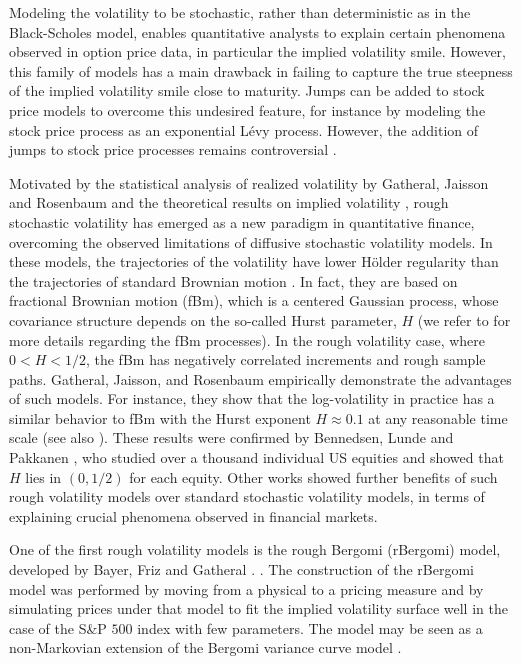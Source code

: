 Modeling the volatility to be stochastic, rather than deterministic as in the Black-Scholes model, enables quantitative analysts to  explain certain phenomena observed in option price data, in particular the implied volatility smile. However, this family of models has a  main drawback in failing  to capture the true steepness of the implied volatility smile close to maturity. Jumps can be added to stock price models to overcome this undesired feature, for instance by modeling the stock price process as an exponential L\'evy process. However, the addition of jumps to stock price processes remains controversial \cite{christensen2014fact,bajgrowicz2015jumps}. 

Motivated by the statistical analysis of realized volatility by Gatheral, Jaisson and Rosenbaum \cite{gatheral2018volatility} and the theoretical results on implied volatility    \cite{alos2007short,fukasawa2011asymptotic}, rough stochastic volatility has emerged as a new paradigm in quantitative finance, overcoming the observed limitations of  diffusive stochastic volatility models. In these models, the trajectories of the volatility  have lower H\"older regularity than the trajectories of standard Brownian motion \cite{bayer2016pricing,gatheral2018volatility}. In fact, they are based on fractional Brownian motion (fBm), which  is a centered Gaussian process, whose covariance structure depends on  the so-called Hurst parameter, $H$ (we refer to  \cite{mandelbrot1968fractional,coutin07introduction,biagini2008stochastic} for more details regarding the fBm processes). In the rough volatility case, where $0<H<1/2$, the fBm has negatively correlated increments and rough sample paths.   Gatheral, Jaisson, and Rosenbaum \cite{gatheral2018volatility}  empirically demonstrate the advantages of such models. For instance, they show that the log-volatility in practice has a similar behavior to  fBm with the Hurst exponent $H \approx 0.1$ at any reasonable time scale (see also  \cite{gatheral2014volatility_2}).  These results were confirmed  by Bennedsen, Lunde and Pakkanen \cite{bennedsen2016decoupling}, who studied over a thousand individual US equities and showed that $H$ lies in $(0,1/2)$ for each equity. Other  works \cite{bennedsen2016decoupling,bayer2016pricing,gatheral2018volatility} showed further benefits of  such rough volatility models over  standard stochastic volatility models,   in terms of explaining crucial phenomena  observed in  financial markets.

One of the first rough volatility models is the rough Bergomi (rBergomi) model, developed by Bayer, Friz and Gatheral \cite{bayer2016pricing}. . The construction of the rBergomi model was performed by  moving from a physical to a pricing measure and by simulating prices under that model to fit  the implied volatility surface well in the case of the S\&P $500$ index with few parameters. The model may be seen as a non-Markovian extension of the Bergomi variance curve model \cite{bergomi2005smile}.

